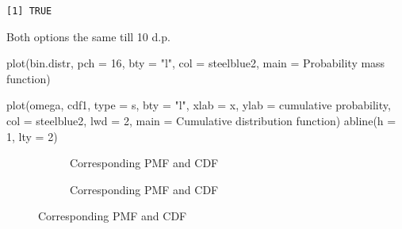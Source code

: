 \documentclass[
  letterpaper,
  DIV=11,
  numbers=noendperiod]{scrreprt}
\newenvironment{Shaded}{\begin{snugshade}}{\end{snugshade}}
\newcommand{\AttributeTok}[1]{\textcolor[rgb]{0.40,0.45,0.13}{#1}}
\newcommand{\DecValTok}[1]{\textcolor[rgb]{0.68,0.00,0.00}{#1}}
\newcommand{\FunctionTok}[1]{\textcolor[rgb]{0.28,0.35,0.67}{#1}}
\newcommand{\NormalTok}[1]{\textcolor[rgb]{0.00,0.23,0.31}{#1}}
\newcommand{\StringTok}[1]{\textcolor[rgb]{0.13,0.47,0.30}{#1}}
\begin{document}
\begin{verbatim}
[1] TRUE
\end{verbatim}

Both options the same till 10 d.p.

\begin{Shaded}
\begin{Highlighting}[]
\FunctionTok{plot}\NormalTok{(bin.distr, }\AttributeTok{pch =} \DecValTok{16}\NormalTok{, }\AttributeTok{bty =} \StringTok{"l"}\NormalTok{, }\AttributeTok{col =} \StringTok{\textquotesingle{}steelblue2\textquotesingle{}}\NormalTok{,}
\AttributeTok{main =} \StringTok{\textquotesingle{}Probability mass function\textquotesingle{}}\NormalTok{)}

\FunctionTok{plot}\NormalTok{(omega, cdf1, }\AttributeTok{type =} \StringTok{\textquotesingle{}s\textquotesingle{}}\NormalTok{, }\AttributeTok{bty =} \StringTok{"l"}\NormalTok{,}
\AttributeTok{xlab =} \StringTok{\textquotesingle{}x\textquotesingle{}}\NormalTok{, }\AttributeTok{ylab =} \StringTok{\textquotesingle{}cumulative probability\textquotesingle{}}\NormalTok{,}
\AttributeTok{col =} \StringTok{\textquotesingle{}steelblue2\textquotesingle{}}\NormalTok{, }\AttributeTok{lwd =} \DecValTok{2}\NormalTok{,}
\AttributeTok{main =} \StringTok{\textquotesingle{}Cumulative distribution function\textquotesingle{}}\NormalTok{)}
\FunctionTok{abline}\NormalTok{(}\AttributeTok{h =} \DecValTok{1}\NormalTok{, }\AttributeTok{lty =} \DecValTok{2}\NormalTok{)}
\end{Highlighting}
\end{Shaded}

\begin{figure}

\begin{minipage}{0.50\linewidth}

\begin{figure}[H]


\caption{\label{fig-bin.dist-1}Corresponding PMF and CDF}

\end{figure}%

\end{minipage}%
%
\begin{minipage}{0.50\linewidth}

\begin{figure}[H]


\caption{\label{fig-bin.dist-2}Corresponding PMF and CDF}

\end{figure}%

\end{minipage}%

\end{figure}%
\end{document}

